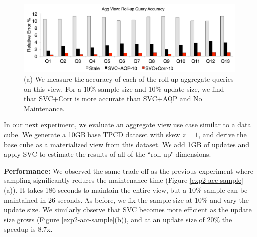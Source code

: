 \begin{figure}[t]
\centering
 \includegraphics[scale=0.13]{exp/msdc_3.pdf}\vspace{-.5em}
   \caption{(a) We measure the accuracy of each of the roll-up aggregate queries on this view. For a 10\% sample size and 10\% update size, we find that SVC+Corr is more accurate than SVC+AQP and No Maintenance.\vspace{-.5em}\label{exp2-acc-sample2}}
\end{figure}





In our next experiment, we evaluate an aggregate view use case similar to a data cube.
We generate a 10GB base TPCD dataset with skew $z=1$, and derive the base cube as a materialized view from this dataset.
We add 1GB of updates and apply SVC to estimate the results of all of the ``roll-up" dimensions.

\textbf{Performance: }
We observed the same trade-off as the previous experiment where sampling significantly reduces the maintenance time (Figure \ref{exp2-acc-sample}(a)).
It takes 186 seconds to maintain the entire view, but a 10\% sample can be maintained in 26 seconds.
As before, we fix the sample size at 10\% and vary the update size.
We similarly observe that SVC becomes more efficient as the update size grows (Figure \ref{exp2-acc-sample}(b)), and at an update size of 20\%  the speedup is 8.7x.


